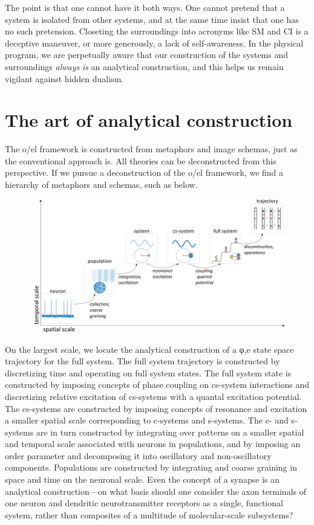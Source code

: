   The point is that one cannot have it both ways. One cannot pretend that a system is isolated from other systems, and at the same time insist that one has no such pretension. Closeting the surroundings into acronyms like SM and CI is a deceptive maneuver, or more generously, a lack of self-awareness. In the physical program, we are perpetually aware that our construction of the systems and surroundings \textit{always} \textit{is} an analytical construction, and this helps us remain vigilant against hidden dualism.

\section{The art of analytical construction}

The o/el framework is constructed from metaphors and image schemas, just as the conventional approach is. All theories can be deconstructed from this perspective. If we pursue a deconstruction of the o/el framework, we find a hierarchy of metaphors and schemas, such as below. 

  
\begin{figure}
\includegraphics[width=\textwidth]{figures/Tilsen-img169.png}
\caption{\missingcaption}
\label{fig:}
\end{figure}
 

  On the largest scale, we locate the analytical construction of a φ,e state space trajectory for the full system. The full system trajectory is constructed by discretizing time and operating on full system states. The full system state is constructed by imposing concepts of phase coupling on cs-system interactions and discretizing relative excitation of cs-systems with a quantal excitation potential. The cs-systems are constructed by imposing concepts of resonance and excitation a smaller spatial scale corresponding to c-systems and s-systems. The c- and s-systems are in turn constructed by integrating over patterns on a smaller spatial and temporal scale associated with neurons in populations, and by imposing an order parameter and decomposing it into oscillatory and non-oscillatory components. Populations are constructed by integrating and coarse graining in space and time on the neuronal scale. Even the concept of a synapse is an analytical construction—on what basis should one consider the axon terminals of one neuron and dendritic neurotransmitter receptors as a single, functional system, rather than composites of a multitude of molecular-scale subsystems? 

